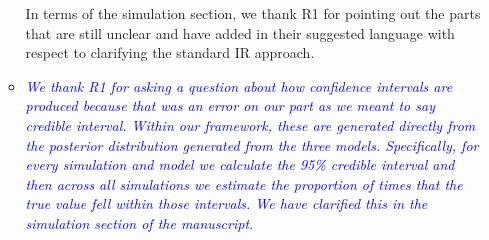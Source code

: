 \begin{enumerate}
\begin{itemize}
{{		In terms of the simulation section, we thank R1 for pointing out the parts that are still unclear and have added in their suggested language with respect to clarifying the standard IR approach.
		}}
		\item  \emph{ \textcolor{blue}{
		We thank R1 for asking a question about how confidence intervals are produced because that was an error on our part as we meant to say credible interval. Within our framework, these are generated directly from the posterior distribution generated from the three models. Specifically, for every simulation and model we calculate the 95\% credible interval and then across all simulations we estimate the proportion of times that the true value fell within those intervals. We have clarified this in the simulation section of the manuscript.}}
	\end{itemize}
\end{enumerate}
